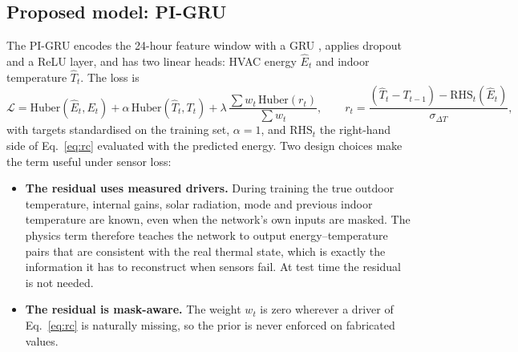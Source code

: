 \subsection{Proposed model: PI-GRU}
The PI-GRU encodes the 24-hour feature window with a GRU \citep{cho2014gru}, applies dropout and a ReLU layer, and has two linear heads: HVAC energy $\hat E_t$ and indoor temperature $\hat T_t$. The loss is
\begin{equation}
\mathcal L = \mathrm{Huber}(\hat E_t, E_t) + \alpha\,\mathrm{Huber}(\hat T_t, T_t) + \lambda\, \frac{\sum w_t\,\mathrm{Huber}(r_t)}{\sum w_t},\qquad
r_t = \frac{(\hat T_t - T_{t-1}) - \mathrm{RHS}_t(\hat E_t)}{\sigma_{\Delta T}}, \label{eq:loss}
\end{equation}
with targets standardised on the training set, $\alpha = 1$, and $\mathrm{RHS}_t$ the right-hand side of Eq.~\eqref{eq:rc} evaluated with the predicted energy. Two design choices make the term useful under sensor loss:
\begin{itemize}[nosep]
\item \textbf{The residual uses measured drivers.} During training the true outdoor temperature, internal gains, solar radiation, mode and previous indoor temperature are known, even when the network's own inputs are masked. The physics term therefore teaches the network to output energy--temperature pairs that are consistent with the real thermal state, which is exactly the information it has to reconstruct when sensors fail. At test time the residual is not needed.
\item \textbf{The residual is mask-aware.} The weight $w_t$ is zero wherever a driver of Eq.~\eqref{eq:rc} is naturally missing, so the prior is never enforced on fabricated values.
\end{itemize}

